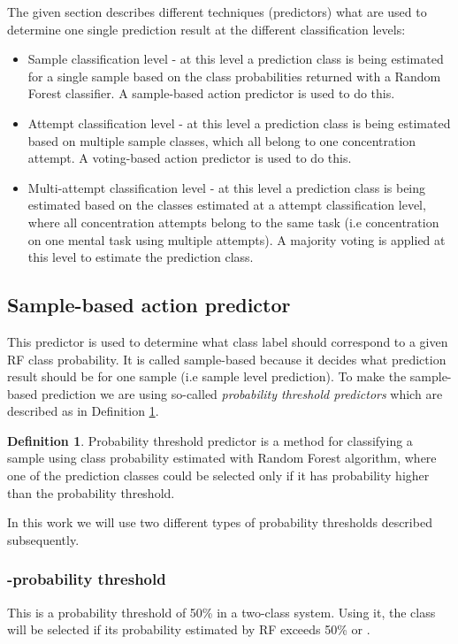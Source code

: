 \documentclass[12pt]{article}
\theoremstyle{definition}
\newtheorem{definition}{Definition}[section]
\begin{document}
The given section describes different techniques (predictors) what are used to determine one single prediction result at the different classification levels:
\begin{itemize}
\item Sample classification level - at this level a prediction class is being estimated for a single sample based on the class probabilities returned with a Random Forest classifier. A sample-based action predictor is used to do this.
\item Attempt classification level - at this level a prediction class is being estimated based on multiple sample classes, which all belong to one concentration attempt. A voting-based action predictor  is used to do this.
\item Multi-attempt classification level - at this level a prediction class is being estimated based on the classes estimated at a attempt classification level, where all concentration attempts belong to the same task (i.e concentration on one mental task using multiple attempts). A majority voting is applied at this level to estimate the prediction class.
\end{itemize}

\subsection{Sample-based action predictor}

This predictor is used to determine what class label should correspond to a given RF class probability. It is called sample-based because it decides what prediction result should be for one sample (i.e sample level prediction). To make the sample-based prediction we are using so-called \textit{probability threshold predictors} which are described as in Definition \ref{def:prb_thr}.
\theoremstyle{definition}
\begin{definition}
\label{def:prb_thr}
Probability threshold predictor is a method for classifying a sample using class probability estimated with Random Forest algorithm, where one of the prediction classes could be selected only if it has probability higher than the probability threshold. 
\end{definition}
In this work we will use two different types of probability thresholds described subsequently. 
\subsubsection{\texorpdfstring{-probability threshold}{Lg}}
This is a probability threshold of 50\% in a two-class system. Using it, the class will be selected if its probability estimated by RF exceeds 50\% or .
\end{document}
